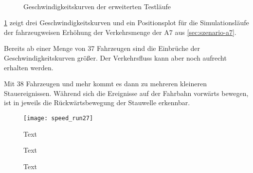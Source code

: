 \begin{figure}[hptb]
  \centering
   \qquad 
   \qquad 
    \\
  \caption{Geschwindigkeitskurven der erweiterten Testläufe}
  \label{figure:short-a7}
\end{figure}

\cref{figure:short-a7} zeigt drei Geschwindigkeitskurven und ein Positionsplot für die Simulationsläufe der fahrzeugweisen Erhöhung der Verkehrsmenge der A7 aus \cref{sec:szenario-a7}.

Bereits ab einer Menge von 37 Fahrzeugen sind die Einbrüche der Geschwindigkeitskurven größer.
Der Verkehrsfluss kann aber noch aufrecht erhalten werden.

Mit 38 Fahrzeugen und mehr kommt es dann zu mehreren kleineren Stauereignissen.
Während sich die Ereignisse auf der Fahrbahn vorwärts bewegen, ist in jeweils die Rückwärtsbewegung der Stauwelle erkennbar.






\begin{figure}[hptb]
 \centering
 \texttt{[image: speed\_run27]}
 \caption[kurzText]
 		{Text}
 \label{figure:image1}
\end{figure}


\begin{figure}[hptb]
  \centering 
   \qquad 
     \caption{Text} 
  \label{figure:image2}
\end{figure}


\begin{figure}[hptb]
  \centering 
   \qquad 
   \qquad 
  \caption{Text} 
  \label{figure:image3}
\end{figure}

